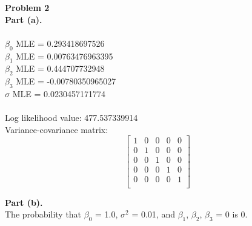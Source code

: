 \documentclass[letterpaper,12pt]{article}
\theoremstyle{definition}
\begin{document}
\noindent\textbf{Problem 2} \\
\textbf {Part (a).} \\\\
\noindent
$\beta_0$ MLE = 0.293418697526\\
$\beta_1$ MLE = 0.00763476963395\\
$\beta_2$ MLE = 0.444707732948\\
$\beta_3$ MLE = -0.00780350965027\\
$\sigma$ MLE = 0.0230457171774\\\\
Log likelihood value: 477.537339914\\
Variance-covariance matrix: \\
$$ \left[
\begin{array}{ccccc}
 1 & 0 & 0 & 0 & 0 \\
 0 & 1 & 0 & 0 & 0 \\
 0 & 0 & 1 & 0 & 0 \\
 0 & 0 & 0 & 1 & 0 \\
 0 & 0 & 0 & 0 & 1 \\
\end{array} \right] 
$$

\noindent
\textbf {Part (b).} \\
\noindent
The probability that $\beta_0$ = 1.0, $\sigma^2$ = 0.01, and $\beta_1$, $\beta_2$, $\beta_3$ = 0 is 0.  \\
\end{document}
